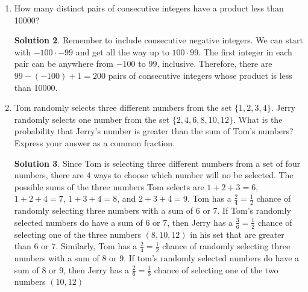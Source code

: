 \documentclass{article}
\theoremstyle{definition}
\newtheorem*{solution}{Solution}
\begin{document}
\begin{enumerate}
\begin{enumerate}
\begin{solution}
                    Alternatively, we can compute the perimeter of the fence, 
                    which is $2(60 + 30) = 180$. The fence posts divide this 
                    perimeter into three yard sections, and since the fence is a 
                    cycle, each section corresponds to one fence post.  
                    Therefore, there are $\frac{180}{3}$ fence posts.
                \end{solution}
        \end{enumerate}
    \item How many distinct pairs of consecutive integers have a product less 
        than \num{10000}?
        \begin{solution}
            Remember to include consecutive negative integers. We can start with 
            $-100 \cdot -99$ and get all the way up to $100 \cdot 99$. The first 
            integer in each pair can be anywhere from $-100$ to $99$, inclusive.  
            Therefore, there are $99 - (-100) + 1 = 200$ pairs of consecutive 
            integers whose product is less than \num{10000}.
        \end{solution}
    \item Tom randomly selects three different numbers from the set $\{1, 2, 3, 
        4\}$. Jerry randomly selects one number from the set $\{2, 4, 6, 8 ,10, 
        12\}$. What is the probability that Jerry's number is greater than the 
        sum of Tom's numbers? Express your answer as a common fraction.
        \begin{solution}
            Since Tom is selecting three different numbers from a set of four 
            numbers, there are $4$ ways to choose which number will no be 
            selected. The possible sums of the three numbers Tom selects are $1 
            + 2 + 3 = 6$, $1 + 2 + 4 = 7$, $1 + 3 + 4 = 8$, and $2 + 3 + 4 = 9$.  
            Tom has a $\frac{2}{4} = \frac{1}{2}$ chance of randomly selecting 
            three numbers with a sum of $6$ or $7$. If Tom's randomly selected 
            numbers do have a sum of $6$ or $7$, then Jerry has a $\frac{3}{6} = 
            \frac{1}{2}$ chance of selecting one of the three numbers $(8, 10, 
            12)$ in his set that are greater than $6$ or $7$.  Similarly, Tom 
            has a $\frac{2}{4} = \frac{1}{2}$ chance of randomly selecting three 
            numbers with a sum of $8$ or $9$. If tom's randomly selected numbers 
            do have a sum of $8$ or $9$, then Jerry has a $\frac{2}{6} = 
            \frac{1}{3}$ chance of selecting one of the two numbers $(10, 12)$ 

\end{solution}
\end{enumerate}
\end{document}
